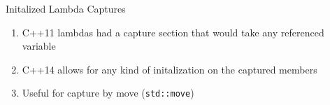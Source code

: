 \documentclass{beamer}
\begin{document}
\begin{frame}{Initalized Lambda Captures}
 \begin{enumerate}
  \item C++11 lambdas had a capture section that would take any referenced variable
  \item C++14 allows for any kind of initalization on the captured members
  \item Useful for capture by move (\texttt{std::move})
 \end{enumerate}

\end{frame}
\end{document}
